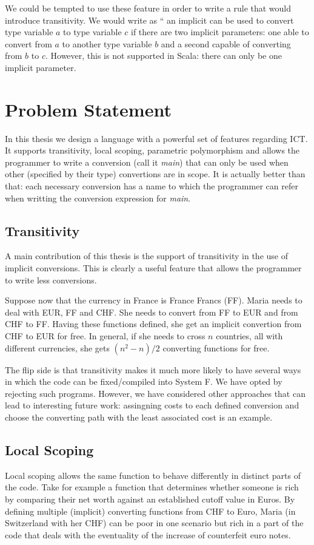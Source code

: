 We could be tempted to use these feature in order to write a rule that would introduce transitivity. We would write as `` an implicit can be used to convert type variable $a$ to type variable $c$ if there are two implicit parameters: one able to convert from $a$ to another type variable $b$ and a second capable of converting from $b$ to $c$. However, this is not supported in Scala: there can only be one implicit parameter.
\section{Problem Statement}
In this thesis we design a language with a powerful set of features regarding ICT. It supports transitivity, local scoping, parametric polymorphism and allows the programmer to write a conversion (call it \textit{ main}) that can only be used when other (specified by their type) convertions  are in scope. It is actually better than that: each necessary conversion has a name to which the programmer can refer when writting the conversion expression for \textit{ main}.

\subsection{Transitivity}
A main contribution of this thesis is the support of transitivity in the use of implicit conversions. This is clearly a useful feature that allows the programmer to write less conversions.

Suppose now that the currency in France is France Francs (FF). Maria needs to deal with EUR, FF and CHF. She needs to convert from FF to EUR and from CHF to FF. Having these functions defined, she get an implicit convertion from CHF to EUR for free. In general, if she needs to cross $n$ countries, all with different currencies, she gets $(n^2-n)/2$ converting functions for free.

The flip side is that transitivity makes it much more likely to have several ways in which the code can be fixed/compiled into System F. We have opted by rejecting such programs. However, we have considered other approaches that can lead to interesting future work: assingning costs to each defined conversion and choose the converting path with the least associated cost is an example.

\subsection{Local Scoping}
Local scoping allows the same function to behave differently in distinct parts of the code. Take for example a function that determines whether someone is rich by comparing their net worth against an established cutoff value in Euros. By defining multiple (implicit) converting functions from CHF to Euro, Maria (in Switzerland with her CHF) can be poor in one scenario but rich in a part of the code that deals with the eventuality of the increase of counterfeit euro notes.

